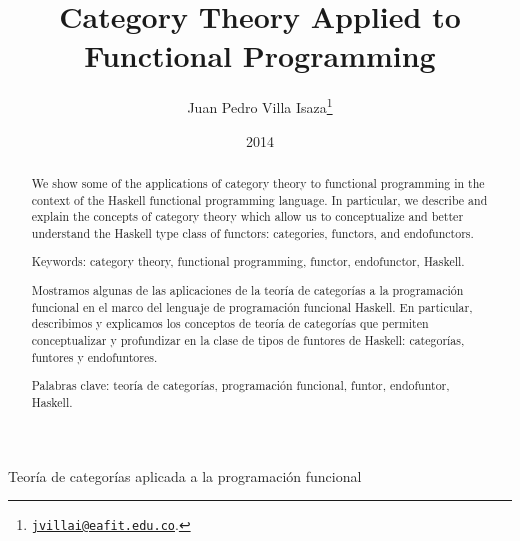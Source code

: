 \documentclass[11pt,letterpaper]{article}
\theoremstyle{definition}
\begin{document}
\title{Category Theory Applied to Functional Programming}

\author{Juan Pedro Villa Isaza\thanks{
    \href{mailto:jvillai@eafit.edu.co}{\nolinkurl{jvillai@eafit.edu.co}}.}}

\date{2014}

\maketitle

\begin{abstract}

  We show some of the applications of category theory to functional
  programming in the context of the Haskell functional programming
  language. In particular, we describe and explain the concepts of
  category theory which allow us to conceptualize and better
  understand the Haskell type class of functors: categories, functors,
  and endofunctors.

  \vspace{1em}
  \noindent
  Keywords: category theory, functional programming, functor,
  endofunctor, Haskell.

\end{abstract}

\begin{spanish}

  \begin{center}

    {\Large Teoría de categorías aplicada a la programación funcional}

  \end{center}

  \begin{abstract}

    Mostramos algunas de las aplicaciones de la teoría de categorías a
    la programación funcional en el marco del lenguaje de programación
    funcional Haskell. En particular, describimos y explicamos los
    conceptos de teoría de categorías que permiten conceptualizar y
    profundizar en la clase de tipos de funtores de Haskell:
    categorías, funtores y endofuntores.

    \vspace{1em}
    \noindent
    Palabras clave: teoría de categorías, programación funcional,
    funtor, endofuntor, Haskell.

  \end{abstract}

\end{spanish}
\end{document}
